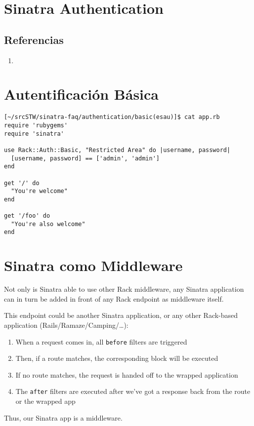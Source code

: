 \section{Sinatra Authentication}
\label{section:authentication}


\subsection{Referencias}
\begin{enumerate}
\item {}
\end{enumerate}


\section{Autentificación Básica}
\label{section:basicauthentication}
\begin{verbatim}
[~/srcSTW/sinatra-faq/authentication/basic(esau)]$ cat app.rb 
require 'rubygems'
require 'sinatra'

use Rack::Auth::Basic, "Restricted Area" do |username, password|
  [username, password] == ['admin', 'admin']
end

get '/' do
  "You're welcome"
end

get '/foo' do
  "You're also welcome"
end

\end{verbatim}

\section{Sinatra como Middleware}

Not only is Sinatra able to use other Rack middleware, any Sinatra
application can in turn be added in front of any Rack endpoint as
middleware itself. 

This endpoint could be another Sinatra application,
or any other Rack-based application (Rails/Ramaze/Camping/…):


\begin{enumerate}
\item 
When a request comes in, all \verb|before| filters are triggered
\item 
Then, if a route matches, the corresponding block will be executed
\item 
If no route matches, the request is handed off to the wrapped application
\item 
The \verb|after| filters are executed after we've got a response back from the
route or  the wrapped app
\end{enumerate}
Thus, our Sinatra app is a middleware.

